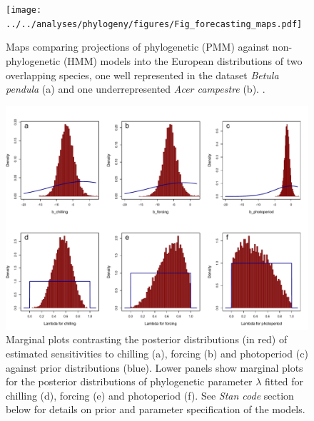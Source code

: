 \documentclass[11pt]{article}
\begin{document}
\clearpage
\begin{figure}
  \begin{center}
  \texttt{[image: ../../analyses/phylogeny/figures/Fig\_forecasting\_maps.pdf]}
  \caption{Maps comparing projections of phylogenetic (PMM) against non-phylogenetic (HMM) models into the European distributions of two overlapping species, one well represented in the dataset \emph{Betula pendula} (a) and one underrepresented \emph{Acer campestre} (b).  .}
  \label{fig:pmmvshmm}
  \end{center}
\end{figure}


\clearpage
\begin{figure}
  \begin{center}
  \includegraphics[width=14cm]{../../analyses/phylogeny/figures/FigSXX_marginal_plots_betas_lambda.pdf}
  \caption{Marginal plots contrasting the posterior distributions (in red) of estimated sensitivities to chilling (a), forcing (b) and photoperiod (c) against prior distributions (blue). Lower panels show marginal plots for the posterior distributions of phylogenetic parameter $\lambda$ fitted for chilling (d), forcing (e) and photoperiod (f). See \emph{Stan code} section below for details on prior and parameter specification of the models.}
  \label{fig:marginalplots}
  \end{center}
\end{figure}
\end{document}
